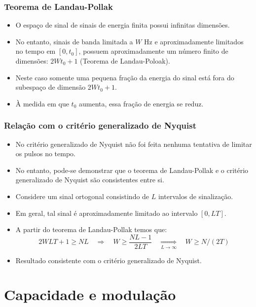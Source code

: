 \begin{frame}
	\frametitle{Teorema de Landau-Pollak}

	\begin{itemize}	   
	    \item O espaço de sinal de sinais de energia finita possui infinitas dimensões.
	    \item No entanto, sinais de banda limitada a $W$ Hz e aproximadamente limitados no tempo em $[0,t_0]$, possuem aproximadamente um número finito de dimensões: $2Wt_0+1$ (Teorema de Landau-Poloak).
	    \item Neste caso somente uma pequena fração da energia do sinal está fora do subespaço de dimensão $2Wt_0+1$.
	    \item À medida em que $t_0$ aumenta, essa fração de energia se reduz.
	\end{itemize}	 
\end{frame}


\begin{frame}
	\frametitle{Relação com o critério generalizado de Nyquist}

	\begin{itemize}
	    \item No critério generalizado de Nyquist não foi feita nenhuma tentativa de limitar os pulsos no tempo.
	    \item No entanto, pode-se demonstrar que o teorema de Landau-Pollak e o critério generalizado de Nyquist são consistentes entre si.
	    \item Considere um sinal ortogonal consistindo de $L$ intervalos de sinalização.
	    \item Em geral, tal sinal é aproximadamente limitado ao intervalo $[0,LT]$.
	    \item A partir do teorema de Landau-Pollak temos que:
	    \begin{equation*}
		2WLT + 1 \geq NL \quad \Longrightarrow \quad W \geq \frac{NL-1}{2LT} \quad \underset{\scriptscriptstyle L\rightarrow \infty}{\Longrightarrow} \quad W \geq N/(2T)
	    \end{equation*}
	    \item Resultado consistente com o critério generalizado de Nyquist.
	\end{itemize}
\end{frame}

\section{Capacidade e modulação}

